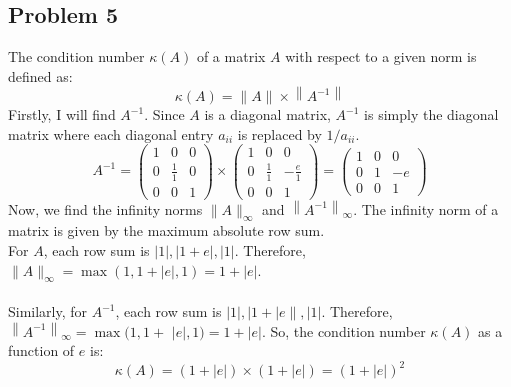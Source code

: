\documentclass[manuscript,screen,review]{acmart}
\begin{document}
\subsection*{Problem 5}
The condition number $\kappa(A)$ of a matrix $A$ with respect to a given norm is defined as:
$$
\kappa(A)=\|A\| \times\left\|A^{-1}\right\|
$$
Firstly, I will find $A^{-1}$. Since $A$ is a diagonal matrix, $A^{-1}$ is simply the diagonal matrix where each diagonal entry $a_{i i}$ is replaced by $1 / a_{i i}$.
$$
A^{-1}=\left(\begin{array}{ccc}
1 & 0 & 0 \\
0 & \frac{1}{1} & 0 \\
0 & 0 & 1
\end{array}\right) \times\left(\begin{array}{ccc}
1 & 0 & 0 \\
0 & \frac{1}{1} & -\frac{e}{1} \\
0 & 0 & 1
\end{array}\right)=\left(\begin{array}{ccc}
1 & 0 & 0 \\
0 & 1 & -e \\
0 & 0 & 1
\end{array}\right)
$$
Now, we find the infinity norms $\|A\|_{\infty}$ and $\left\|A^{-1}\right\|_{\infty}$.
The infinity norm of a matrix is given by the maximum absolute row sum. 
\\
For $A$, each row sum is $|1|,|1+e|,|1|$. Therefore, $\|A\|_{\infty}=\max (1,1+|e|, 1)=1+|e|$.
\\
\\
Similarly, for $A^{-1}$, each row sum is $|1|,|1+| e \|,|1|$. Therefore, $\left\|A^{-1}\right\|_{\infty}=\max (1,1+$ $|e|, 1)=1+|e|$.
So, the condition number $\kappa(A)$ as a function of $e$ is:
$$
\kappa(A)=(1+|e|) \times(1+|e|)=(1+|e|)^2
$$
\end{document}
